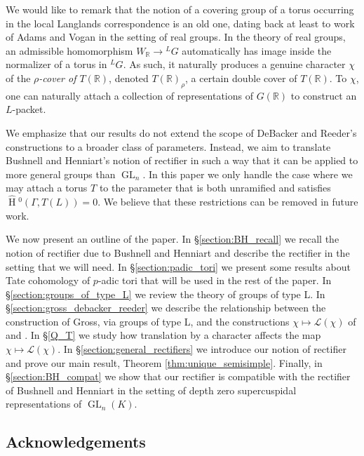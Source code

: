 \documentclass{amsart}
\theoremstyle{plain}
\newcommand{\HT}[1]{\hat{\HH}{}^{#1}}
\theoremstyle{definition}
\numberwithin{equation}{section}
\DeclareMathOperator{\HH}{H}
\DeclareMathOperator{\GL}{GL}
\newcommand{\Lpack}{\mathcal{L}}
\begin{document}
We would like to remark that the notion of a covering group of a torus occurring in the local Langlands
correspondence is an old one, dating back at least to work of Adams and Vogan \cite{adams-vogan:91}
in the setting of real groups.  In the theory of real groups, an admissible homomorphism
$W_{\mathbb{R}} \rightarrow {}^L G$ automatically has image inside the normalizer of a torus in ${}^L G$.
As such, it naturally produces a genuine character $\chi$ of the \emph{$\rho$-cover of $T(\mathbb{R})$},
denoted $T(\mathbb{R})_{\rho}$, a certain double cover of $T(\mathbb{R})$.  To $\chi$,
one can naturally attach a collection of representations of $G(\mathbb{R})$ to construct an $L$-packet.

We emphasize that our results do not extend the scope of DeBacker and Reeder's constructions to a broader class of parameters.
Instead, we aim to translate Bushnell and Henniart's notion of rectifier in such a way that it can be applied
to more general groups than $\GL_n$.  In this paper we only handle the case where we may attach a torus $T$
to the parameter that is both unramified and satisfies $\HT{0}(\Gamma, T(L)) = 0$.  We believe that these restrictions can be removed in future work.

We now present an outline of the paper.  In \S\ref{section:BH_recall} we recall
the notion of rectifier due to Bushnell and Henniart and describe
the rectifier in the setting that we will need.  In \S\ref{section:padic_tori}
we present some results about Tate cohomology of $p$-adic tori that will be used
in the rest of the paper.  In \S\ref{section:groups_of_type_L} we review
the theory of groups of type L.  In
\S\ref{section:gross_debacker_reeder} we describe the relationship between the
construction of Gross, via groups of type L, and the constructions $\chi \mapsto \Lpack(\chi)$ of
\cite{reeder-debacker:09a} and \cite{reeder:08a}.  In \S\ref{Q_T} we study how translation by a character affects
the map $\chi \mapsto \Lpack(\chi)$.
In \S\ref{section:general_rectifiers} we
introduce our notion of rectifier and prove our main result, Theorem \ref{thm:unique_semisimple}.
Finally, in \S\ref{section:BH_compat} we show that our rectifier is compatible with
the rectifier of Bushnell and Henniart in the setting of depth zero
supercuspidal representations of $\GL_n(K)$.

\subsection*{Acknowledgements}
\end{document}
